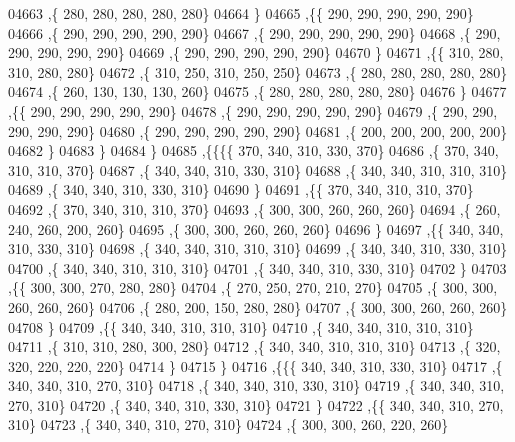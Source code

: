 \begin{DoxyCode}
04663     ,\{   280,   280,   280,   280,   280\}
04664     \}
04665    ,\{\{   290,   290,   290,   290,   290\}
04666     ,\{   290,   290,   290,   290,   290\}
04667     ,\{   290,   290,   290,   290,   290\}
04668     ,\{   290,   290,   290,   290,   290\}
04669     ,\{   290,   290,   290,   290,   290\}
04670     \}
04671    ,\{\{   310,   280,   310,   280,   280\}
04672     ,\{   310,   250,   310,   250,   250\}
04673     ,\{   280,   280,   280,   280,   280\}
04674     ,\{   260,   130,   130,   130,   260\}
04675     ,\{   280,   280,   280,   280,   280\}
04676     \}
04677    ,\{\{   290,   290,   290,   290,   290\}
04678     ,\{   290,   290,   290,   290,   290\}
04679     ,\{   290,   290,   290,   290,   290\}
04680     ,\{   290,   290,   290,   290,   290\}
04681     ,\{   200,   200,   200,   200,   200\}
04682     \}
04683    \}
04684   \}
04685  ,\{\{\{\{   370,   340,   310,   330,   370\}
04686     ,\{   370,   340,   310,   310,   370\}
04687     ,\{   340,   340,   310,   330,   310\}
04688     ,\{   340,   340,   310,   310,   310\}
04689     ,\{   340,   340,   310,   330,   310\}
04690     \}
04691    ,\{\{   370,   340,   310,   310,   370\}
04692     ,\{   370,   340,   310,   310,   370\}
04693     ,\{   300,   300,   260,   260,   260\}
04694     ,\{   260,   240,   260,   200,   260\}
04695     ,\{   300,   300,   260,   260,   260\}
04696     \}
04697    ,\{\{   340,   340,   310,   330,   310\}
04698     ,\{   340,   340,   310,   310,   310\}
04699     ,\{   340,   340,   310,   330,   310\}
04700     ,\{   340,   340,   310,   310,   310\}
04701     ,\{   340,   340,   310,   330,   310\}
04702     \}
04703    ,\{\{   300,   300,   270,   280,   280\}
04704     ,\{   270,   250,   270,   210,   270\}
04705     ,\{   300,   300,   260,   260,   260\}
04706     ,\{   280,   200,   150,   280,   280\}
04707     ,\{   300,   300,   260,   260,   260\}
04708     \}
04709    ,\{\{   340,   340,   310,   310,   310\}
04710     ,\{   340,   340,   310,   310,   310\}
04711     ,\{   310,   310,   280,   300,   280\}
04712     ,\{   340,   340,   310,   310,   310\}
04713     ,\{   320,   320,   220,   220,   220\}
04714     \}
04715    \}
04716   ,\{\{\{   340,   340,   310,   330,   310\}
04717     ,\{   340,   340,   310,   270,   310\}
04718     ,\{   340,   340,   310,   330,   310\}
04719     ,\{   340,   340,   310,   270,   310\}
04720     ,\{   340,   340,   310,   330,   310\}
04721     \}
04722    ,\{\{   340,   340,   310,   270,   310\}
04723     ,\{   340,   340,   310,   270,   310\}
04724     ,\{   300,   300,   260,   220,   260\}

\end{DoxyCode}
